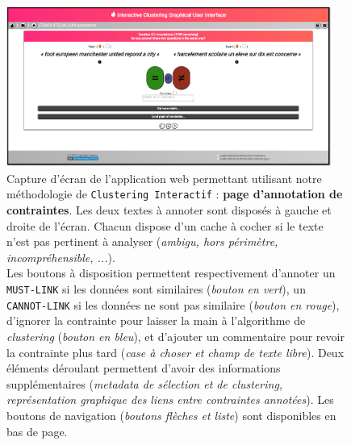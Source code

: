 			\begin{figure}[!htb]
				\centering
				\includegraphics[width=0.95\textwidth]{figures/etude-temps-annotation-0application-annotation}
				\caption{
					Capture d'écran de l'application web permettant utilisant notre méthodologie de \texttt{Clustering Interactif} : \textbf{page d'annotation de contraintes}.
					Les deux textes à annoter sont disposés à gauche et droite de l'écran.
					Chacun dispose d'un cache à cocher si le texte n'est pas pertinent à analyser (\textit{ambigu, hors périmètre, incompréhensible, ...}).\\
					Les boutons à disposition permettent respectivement d'annoter un \texttt{MUST-LINK} si les données sont similaires (\textit{bouton en vert}), un \texttt{CANNOT-LINK} si les données ne sont pas similaire (\textit{bouton en rouge}), d'ignorer la contrainte pour laisser la main à l'algorithme de \textit{clustering} (\textit{bouton en bleu}), et d'ajouter un commentaire pour revoir la contrainte plus tard (\textit{case à choser et champ de texte libre}).
					Deux éléments déroulant permettent d'avoir des informations supplémentaires (\textit{metadata de sélection et de \textit{clustering}, représentation graphique des liens entre contraintes annotées}).
					Les boutons de navigation (\textit{boutons flèches et liste}) sont disponibles en bas de page.
				}
				\label{figure:4.3.1-ETUDE-COUTS-TEMPS-ANNOTATION-APPLICATION-ANNOTATION}
			\end{figure}
